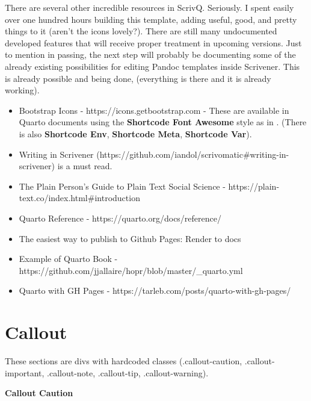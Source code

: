 \documentclass[
  12pt,
  a4paper,
  oneside,
  numbers=noenddot,
  titlepage,
  toclink=all,
  toc=bibliography]{scrbook}
\providecommand{\tightlist}{%
  \setlength{\itemsep}{0pt}\setlength{\parskip}{0pt}}
\theoremstyle{definition}
\theoremstyle{definition}
\theoremstyle{definition}
\theoremstyle{plain}
\theoremstyle{plain}
\theoremstyle{plain}
\theoremstyle{plain}
\theoremstyle{plain}
\theoremstyle{remark}
\begin{document}
There are several other incredible resources in ScrivQ. Seriously. I
spent easily over one hundred hours building this template, adding
useful, good, and pretty things to it (aren't the icons lovely?). There
are still many undocumented developed features that will receive proper
treatment in upcoming versions. Just to mention in passing, the next
step will probably be documenting some of the already existing
possibilities for editing Pandoc templates inside Scrivener. This is
already possible and being done, (everything is there and it is already
working).

\begin{itemize}
\tightlist
\item
  Bootstrap Icons - https://icons.getbootstrap.com - These are available
  in Quarto documents using the \textbf{Shortcode Font Awesome} style as
  in \texttt{} . (There is also \textbf{Shortcode Env},
  \textbf{Shortcode Meta}, \textbf{Shortcode Var}).
\item
  Writing in Scrivener
  (https://github.com/iandol/scrivomatic\#writing-in-scrivener) is a
  must read.
\item
  The Plain Person's Guide to Plain Text Social Science -
  https://plain-text.co/index.html\#introduction
\item
  Quarto Reference - https://quarto.org/docs/reference/
\item
  The easiest way to publish to Github Pages: Render to docs
\item
  Example of Quarto Book -
  https://github.com/jjallaire/hopr/blob/master/\_quarto.yml
\item
  Quarto with GH Pages - https://tarleb.com/posts/quarto-with-gh-pages/
\end{itemize}

\hypertarget{sec-scriv53}{%
\section{Callout}\label{sec-scriv53}}

These sections are divs with hardcoded classes (.callout-caution,
.callout-important, .callout-note, .callout-tip, .callout-warning).

\begin{tcolorbox}[enhanced jigsaw, rightrule=.15mm, opacityback=0, arc=.35mm, colback=white, toprule=.15mm, breakable, bottomrule=.15mm, left=2mm, colframe=quarto-callout-caution-color-frame, leftrule=.75mm]
\begin{minipage}[t]{5.5mm}
\textcolor{quarto-callout-caution-color}{\faFire}
\end{minipage}%
\begin{minipage}[t]{\textwidth - 5.5mm}

\textbf{Callout Caution}\vspace{2mm}

\end{minipage}%
\end{tcolorbox}
\end{document}
